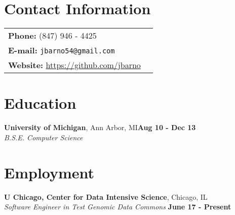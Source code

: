 \documentclass[margin,line]{res}
\begin{document}
\address{ 5467 S Ingleside Ave}
\address{ APT 3W, Chicago IL} 

\begin{resume}

\section{\sc Contact Information}
\begin{tabular}{@{}p{3in}p{4in}}
{\bf Phone:}   (847) 946 - 4425\\
{\bf E-mail:}  {\tt jbarno54@gmail.com} \\
{\bf Website:} \url{https://github.com/jbarno} \\
\end{tabular}


\section{\sc Education}
{\bf University of Michigan}, Ann Arbor, MI\hfill {\bf Aug 10  - Dec 13}\\
    {\em B.S.E. Computer Science}


\section{\sc Employment}
    {\bf U Chicago, Center for Data Intensive Science}, Chicago, IL\\
    {\em Software Engineer in Test Genomic Data Commons} \hfill {\bf  June 17 - Present}\\


\end{resume}
\end{document}
